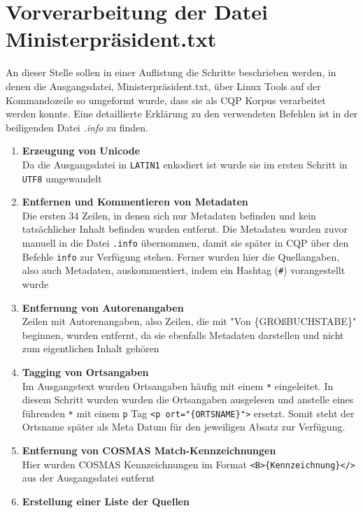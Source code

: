 \documentclass[%
	type=document,%
  	style=article,%
  	media=print,
  	pages=oneside,%
  	prefixLecturer=Dozenten:,
  	author=multiple,
]{unihildesheim} %
\begin{document}
\Titlepage
\cleardoublepage
\TOC
\cleardoublepage

%

\section{Vorverarbeitung der Datei Ministerpräsident.txt}
An dieser Stelle sollen in einer Auflistung die Schritte beschrieben werden,
in denen die Ausgangsdatei, Ministerpräsident.txt, über Linux Tools auf der
Kommandozeile so umgeformt wurde, dass sie als CQP Korpus verarbeitet werden
konnte. Eine detaillierte Erklärung zu den verwendeten Befehlen ist in der
beiligenden Datei \textit{.info} zu finden.
\begin{enumerate}
  \item \textbf{Erzeugung von Unicode}
  \\Da die Ausgangsdatei in \texttt{LATIN1} enkodiert ist
  wurde sie im ersten Schritt in \texttt{UTF8} umgewandelt
  \item \textbf{Entfernen und Kommentieren von Metadaten}
   \\Die ersten 34 Zeilen, in denen sich nur Metadaten befinden und kein
  tatsächlicher Inhalt befinden wurden entfernt. Die Metadaten wurden zuvor
  manuell in die Datei \texttt{.info} übernommen, damit sie später in CQP über
  den Befehle \texttt{info} zur Verfügung stehen. Ferner wurden hier die
  Quellangaben, also auch Metadaten, auskommentiert, indem ein Hashtag
  (\texttt{\#}) vorangestellt wurde
  \item \textbf{Entfernung von Autorenangaben}
  \\ Zeilen mit Autorenangaben, also Zeilen, die mit "Von \{GROßBUCHSTABE\}"
  beginnen, wurden entfernt, da sie ebenfalls Metadaten darstellen und nicht zum
  eigentlichen Inhalt gehören
  \item \textbf{Tagging von Ortsangaben}
  \\ Im Ausgangstext wurden Ortsangaben häufig mit einem \texttt{*} eingeleitet.
  In diesem Schritt wurden wurden die Ortsangaben ausgelesen und anstelle eines
  führenden \texttt{*} mit einem \texttt{p} Tag \texttt{<p
  ort="\{ORTSNAME\}">} ersetzt.
  Somit steht der Ortsname später als Meta Datum für den jeweiligen Absatz zur Verfügung.
  \item \textbf{Entfernung von COSMAS Match-Kennzeichnungen}
  \\ Hier wurden COSMAS Kennzeichnungen im Format
  \texttt{<B>\{Kennzeichnung\}</>} aus der Ausgangsdatei entfernt
  \item \textbf{Erstellung einer Liste der Quellen}

\end{enumerate}
\end{document}
